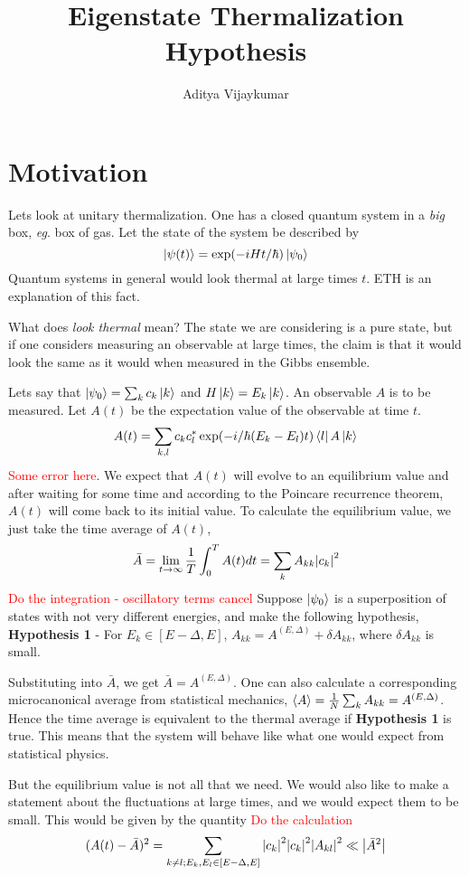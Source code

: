 \documentclass[a4paper,11pt]{article}
\title{\textbf{Eigenstate Thermalization Hypothesis}}
\author{Aditya Vijaykumar}
\affiliation{International Centre for Theoretical Sciences, Bengaluru, India.}
\begin{document}
\maketitle
\section{Motivation}
Lets look at unitary thermalization. One has a closed quantum system in a \textit{big} box, \textit{eg}. box of gas. Let the state of the system be described by 
$$\ket{\psi(t)} = \exp(-i H t/\hbar ) \ket{\psi_0}$$ Quantum systems in general would look thermal at large times $t$. ETH is an explanation of this fact.

What does \textit{look thermal} mean? The state we are considering is a pure state, but if one considers measuring an observable at large times, the claim is that it would look the same as it would when measured in the Gibbs ensemble.

Lets say that $\ket{\psi_0} = \sum_{k} c_k \ket{k}$ and $H\ket{k} = E_k \ket{k}$. An observable $A$ is to be measured. Let $A(t)$ be the expectation value of the observable at time $t$.
$$A(t)  = \sum_{k,l}c_k c_l^* \exp(-i/\hbar (E_k - E_l)t ) \bra{l}A \ket{k}$$ \textcolor{red}{Some error here}. We expect that $A(t)$ will evolve to an equilibrium value and after waiting for some time and according to the Poincare recurrence theorem, $A(t)$ will come back to its initial value. To calculate the equilibrium value, we just take the time average of $A(t)$,
$$\bar{A}=\lim\limits_{t \rightarrow \infty} \frac{1}{T}\int_{0}^{T} A(t) dt = \sum_{k} A_{kk}\abs{c_k}^2$$
\textcolor{red}{Do the integration - oscillatory terms cancel}
Suppose $\ket{\psi_0}$ is a superposition of states with not very different energies, and make the following hypothesis,\\
\textbf{Hypothesis 1} - For $E_k \in [E-\Delta, E]$, $A_{kk} = A^{(E,\Delta)} + \delta A_{kk}$, where $\delta A_{kk}$ is small.

Substituting into $\bar{A}$, we get $\bar{A} = A^{(E,\Delta)}$. One can also calculate a corresponding microcanonical average from statistical mechanics, $\expval{A} = \frac{1}{N}\sum_{k} A_{kk}= A^{(E,\Delta)}$. Hence the time average is equivalent to the thermal average if \textbf{Hypothesis 1} is true. This means that the system will behave like what one would expect from statistical physics. 

But the equilibrium value is not all that we need. We would also like to make a statement about the fluctuations at large times, and we would expect them to be small. This would be given by the quantity \textcolor{red}{Do the calculation}$$(A(t) - \bar{A})^2 = \sum_{k\ne l; E_k, E_l \in [E-\Delta,E]} \abs{c_k}^2 \abs{c_k}^2 \abs{A_{kl}}^2 \ll \abs{\bar{A}^2}$$
\end{document}

